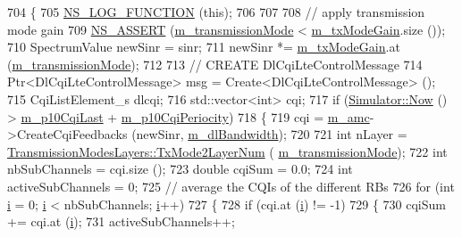 \begin{DoxyCode}
704 \{
705   \hyperlink{log-macros-disabled_8h_a90b90d5bad1f39cb1b64923ea94c0761}{NS\_LOG\_FUNCTION} (\textcolor{keyword}{this});
706 
707 
708   \textcolor{comment}{// apply transmission mode gain}
709   \hyperlink{assert_8h_a6dccdb0de9b252f60088ce281c49d052}{NS\_ASSERT} (\hyperlink{classns3_1_1LteUePhy_afdfda099de8075846985a04826875067}{m\_transmissionMode} < \hyperlink{classns3_1_1LteUePhy_a6d82402117e8a661afd81304862df4c4}{m\_txModeGain}.size ());
710   SpectrumValue newSinr = sinr;
711   newSinr *= \hyperlink{classns3_1_1LteUePhy_a6d82402117e8a661afd81304862df4c4}{m\_txModeGain}.at (\hyperlink{classns3_1_1LteUePhy_afdfda099de8075846985a04826875067}{m\_transmissionMode});
712 
713   \textcolor{comment}{// CREATE DlCqiLteControlMessage}
714   Ptr<DlCqiLteControlMessage> msg = Create<DlCqiLteControlMessage> ();
715   CqiListElement\_s dlcqi;
716   std::vector<int> cqi;
717   \textcolor{keywordflow}{if} (\hyperlink{classns3_1_1Simulator_ac3178fa975b419f7875e7105be122800}{Simulator::Now} () > \hyperlink{classns3_1_1LteUePhy_a360a0a07b343bf1370c5bd99d31dcd2a}{m\_p10CqiLast} + 
      \hyperlink{classns3_1_1LteUePhy_a43fdf08302e7659a495f320c95974c93}{m\_p10CqiPeriocity})
718     \{
719       cqi = \hyperlink{classns3_1_1LteUePhy_ac41d7c77006896a6e9573867fc60f268}{m\_amc}->CreateCqiFeedbacks (newSinr, \hyperlink{classns3_1_1LtePhy_a566aee423c957f3b7ab7f8f7eacc7eb3}{m\_dlBandwidth});
720 
721       \textcolor{keywordtype}{int} nLayer = \hyperlink{classns3_1_1TransmissionModesLayers_a31f608b7bfaa77440fe4cb85ad035329}{TransmissionModesLayers::TxMode2LayerNum} (
      \hyperlink{classns3_1_1LteUePhy_afdfda099de8075846985a04826875067}{m\_transmissionMode});
722       \textcolor{keywordtype}{int} nbSubChannels = cqi.size ();
723       \textcolor{keywordtype}{double} cqiSum = 0.0;
724       \textcolor{keywordtype}{int} activeSubChannels = 0;
725       \textcolor{comment}{// average the CQIs of the different RBs}
726       \textcolor{keywordflow}{for} (\textcolor{keywordtype}{int} \hyperlink{bernuolliDistribution_8m_a6f6ccfcf58b31cb6412107d9d5281426}{i} = 0; \hyperlink{bernuolliDistribution_8m_a6f6ccfcf58b31cb6412107d9d5281426}{i} < nbSubChannels; \hyperlink{bernuolliDistribution_8m_a6f6ccfcf58b31cb6412107d9d5281426}{i}++)
727         \{
728           \textcolor{keywordflow}{if} (cqi.at (\hyperlink{bernuolliDistribution_8m_a6f6ccfcf58b31cb6412107d9d5281426}{i}) != -1)
729             \{
730               cqiSum += cqi.at (\hyperlink{bernuolliDistribution_8m_a6f6ccfcf58b31cb6412107d9d5281426}{i});
731               activeSubChannels++;

\end{DoxyCode}
